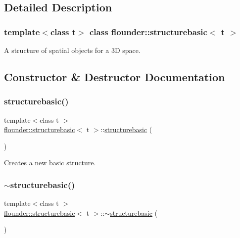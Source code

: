 \subsection{Detailed Description}
\subsubsection*{template$<$class t$>$\newline
class flounder\+::structurebasic$<$ t $>$}

A structure of spatial objects for a 3D space. 



\subsection{Constructor \& Destructor Documentation}
\mbox{\label{classflounder_1_1structurebasic_a4cdb10b77f632a140476bfd33da7cdd7}} 
\subsubsection{\texorpdfstring{structurebasic()}{structurebasic()}}
{\footnotesize\ttfamily template$<$class t $>$ \\
\hyperlink{classflounder_1_1structurebasic}{flounder\+::structurebasic}$<$ t $>$\+::\hyperlink{classflounder_1_1structurebasic}{structurebasic} (\begin{DoxyParamCaption}{ }\end{DoxyParamCaption})}



Creates a new basic structure. 

\mbox{\label{classflounder_1_1structurebasic_a7ce24fc6a91e6a340d8526cc84b2f8ae}} 
\subsubsection{\texorpdfstring{$\sim$structurebasic()}{~structurebasic()}}
{\footnotesize\ttfamily template$<$class t $>$ \\
\hyperlink{classflounder_1_1structurebasic}{flounder\+::structurebasic}$<$ t $>$\+::$\sim$\hyperlink{classflounder_1_1structurebasic}{structurebasic} (\begin{DoxyParamCaption}{ }\end{DoxyParamCaption})}



